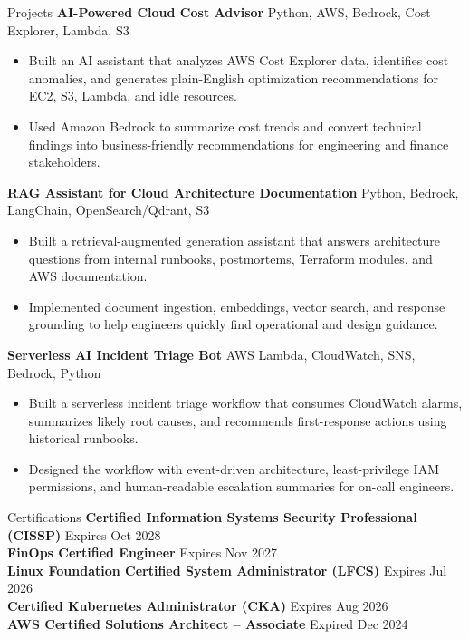 \documentclass{resume} %
\begin{document}
\newpage

\begin{rSection}{Projects}
\textbf{AI-Powered Cloud Cost Advisor} \hfill Python, AWS, Bedrock, Cost Explorer, Lambda, S3
\begin{itemize}
    \item Built an AI assistant that analyzes AWS Cost Explorer data, identifies cost anomalies, and generates plain-English optimization recommendations for EC2, S3, Lambda, and idle resources.
    \item Used Amazon Bedrock to summarize cost trends and convert technical findings into business-friendly recommendations for engineering and finance stakeholders.
\end{itemize}

\textbf{RAG Assistant for Cloud Architecture Documentation} \hfill Python, Bedrock, LangChain, OpenSearch/Qdrant, S3
\begin{itemize}
    \item Built a retrieval-augmented generation assistant that answers architecture questions from internal runbooks, postmortems, Terraform modules, and AWS documentation.
    \item Implemented document ingestion, embeddings, vector search, and response grounding to help engineers quickly find operational and design guidance.
\end{itemize}

\textbf{Serverless AI Incident Triage Bot} \hfill AWS Lambda, CloudWatch, SNS, Bedrock, Python
\begin{itemize}
    \item Built a serverless incident triage workflow that consumes CloudWatch alarms, summarizes likely root causes, and recommends first-response actions using historical runbooks.
    \item Designed the workflow with event-driven architecture, least-privilege IAM permissions, and human-readable escalation summaries for on-call engineers.
\end{itemize}
\end{rSection}

\begin{rSection}{Certifications}
\textbf{Certified Information Systems Security Professional (CISSP)} \hfill Expires Oct 2028\\
\textbf{FinOps Certified Engineer} \hfill Expires Nov 2027\\
\textbf{Linux Foundation Certified System Administrator (LFCS)} \hfill Expires Jul 2026\\
\textbf{Certified Kubernetes Administrator (CKA)} \hfill Expires Aug 2026\\
\textbf{AWS Certified Solutions Architect -- Associate} \hfill Expired Dec 2024
\end{rSection}
\end{document}
